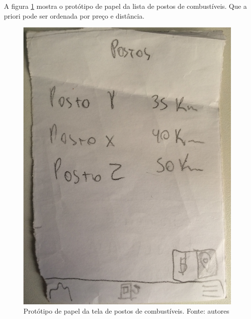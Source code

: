 A figura \ref{img:prototipo_de_papel_lista_postos} mostra o protótipo de papel da lista de postos de combustíveis. Que a priori pode ser ordenada por preço e distância.
\begin{figure}[H]
    \centering
    \includegraphics[scale=0.1, angle=-90]{figuras/prototipo_papel_lista_de_postos.jpg}
    \caption[Protótipo de papel da tela de postos de combustíveis]{Protótipo de papel da tela de postos de combustíveis. Fonte: autores}
    \label{img:prototipo_de_papel_lista_postos}
\end{figure}
 \pagebreak

